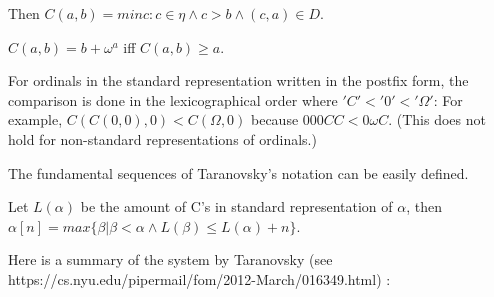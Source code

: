 \documentclass[10pt]{article}
\begin{document}
Then \( C(a,b)=min{c:c\in  \eta  \wedge c>b \wedge (c,a)\in D} \).

\( C(a, b) = b+\omega^a \) iff \( C(a, b) \geq  a \).


For ordinals in the standard representation written in the postfix form, the comparison is done in the lexicographical order where \( 'C' < '0' < '\Omega' \): For example, \( C(C(0,0),0) < C(\Omega, 0) \) because \( 000CC < 0 \omega C \). (This does not hold for non-standard representations of ordinals.)

The fundamental sequences of Taranovsky’s notation can be easily defined.

Let \( L(\alpha) \) be the amount of C’s in standard representation of \( \alpha \), then \( \alpha [n]=max \lbrace \beta | \beta < \alpha  \wedge L(\beta) \leq L(\alpha)+n \rbrace \).

Here is a summary of the system by Taranovsky (see https://cs.nyu.edu/pipermail/fom/2012-March/016349.html) :
\end{document}

